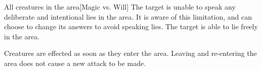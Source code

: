 \spelldur{\durmed}
\begin{spelltargets}{All creatures in the area}[Magic vs. Will]
    \spellsuccess The target is unable to speak any deliberate and intentional lies in the area. It is aware of this limitation, and can choose to change its answers to avoid speaking lies.
    \spellfailure The target is able to lie freely in the area.
\end{spelltargets}
\spellnotes Creatures are effected as soon as they enter the area. Leaving and re-entering the area does not cause a new attack to be made.
